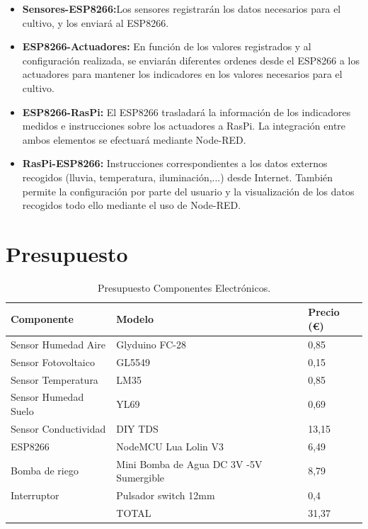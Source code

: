 \documentclass[12pt,a4paper,titlepage,oneside]{report}
\begin{document}
		\begin{itemize}
			\item \textbf{Sensores-ESP8266:}Los sensores registrarán los datos necesarios para el cultivo, y los enviará al ESP8266.
			\item \textbf{ESP8266-Actuadores:} En función de los valores registrados y al configuración realizada, se enviarán diferentes ordenes desde el ESP8266 a los actuadores para mantener los indicadores en los valores necesarios para el cultivo.
			\item \textbf{ESP8266-RasPi:} El ESP8266 trasladará la información de los indicadores medidos e instrucciones sobre los actuadores a RasPi. La integración entre ambos elementos se efectuará mediante Node-RED.
			\item \textbf{RasPi-ESP8266:} Instrucciones correspondientes a los datos externos recogidos (lluvia, temperatura, iluminación,...) desde Internet. También permite la configuración por parte del usuario y la visualización de los datos recogidos todo ello mediante el uso de Node-RED.
			
		\end{itemize}




\newpage
\section{Presupuesto}

\begin{table}[htbp]
\begin{center}
\begin{tabular}{|l||l|l|}
\hline
Componente & Modelo & Precio (€) \\ \hline \hline
Sensor Humedad Aire &	Glyduino FC-28 &	0,85  \\ \hline
Sensor Fotovoltaico &  GL5549 & 0,15 \\ \hline
Sensor Temperatura & LM35 & 0,85 \\ \hline
Sensor Humedad Suelo & YL69 & 0,69 \\ \hline
Sensor Conductividad & DIY TDS & 13,15 \\ \hline
ESP8266 & NodeMCU Lua Lolin V3 & 6,49 \\ \hline
Bomba de riego & Mini Bomba de Agua DC 3V -5V Sumergible & 8,79 \\ \hline
Interruptor & Pulsador switch 12mm & 0,4 \\ \hline
  & TOTAL & 31,37 \\ \hline



\end{tabular}
\caption{Presupuesto Componentes Electrónicos.}
\label{tabla:sencilla}
\end{center}
\end{table}
\end{document}
